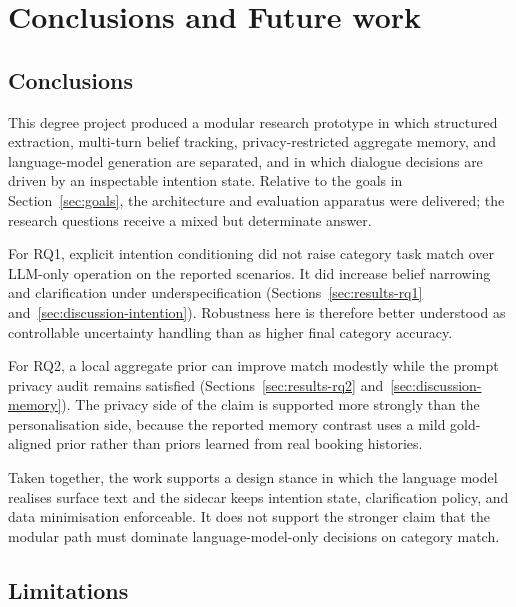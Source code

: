 
\chapter{Conclusions and Future work}
\label{ch:conclusionsAndFutureWork}

\section{Conclusions}
\label{sec:conclusions}

This degree project produced a modular research prototype in which structured extraction, multi-turn belief tracking, privacy-restricted aggregate memory, and language-model generation are separated, and in which dialogue decisions are driven by an inspectable intention state.
Relative to the goals in Section~\ref{sec:goals}, the architecture and evaluation apparatus were delivered; the research questions receive a mixed but determinate answer.

For RQ1, explicit intention conditioning did not raise category task match over LLM-only operation on the reported scenarios.
It did increase belief narrowing and clarification under underspecification (Sections~\ref{sec:results-rq1} and~\ref{sec:discussion-intention}).
Robustness here is therefore better understood as controllable uncertainty handling than as higher final category accuracy.

For RQ2, a local aggregate prior can improve match modestly while the prompt privacy audit remains satisfied (Sections~\ref{sec:results-rq2} and~\ref{sec:discussion-memory}).
The privacy side of the claim is supported more strongly than the personalisation side, because the reported memory contrast uses a mild gold-aligned prior rather than priors learned from real booking histories.

Taken together, the work supports a design stance in which the language model realises surface text and the sidecar keeps intention state, clarification policy, and data minimisation enforceable.
It does not support the stronger claim that the modular path must dominate language-model-only decisions on category match.

\section{Limitations}
\label{sec:limitations}

